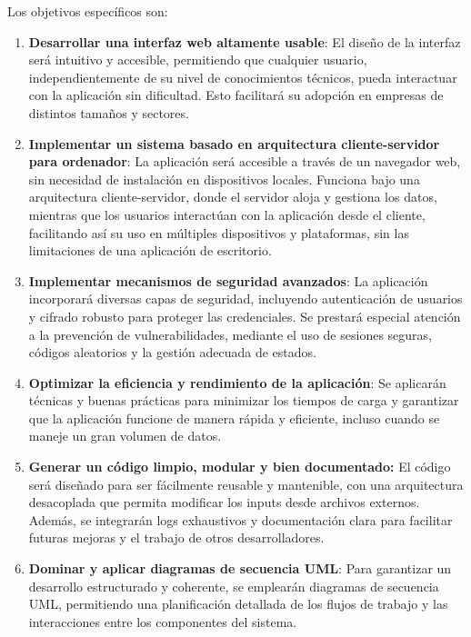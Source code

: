 \documentclass[draft]{scrbook}
\begin{document}
Los objetivos específicos son:
\begin{enumerate}
    \item \textbf{Desarrollar una interfaz web altamente usable}: El diseño de la interfaz será intuitivo y accesible, permitiendo que cualquier usuario, independientemente de su nivel de conocimientos técnicos, pueda interactuar con la aplicación sin dificultad. Esto facilitará su adopción en empresas de distintos tamaños y sectores.

    \item \textbf{Implementar un sistema basado en arquitectura cliente-servidor para ordenador}: La aplicación será accesible a través de un navegador web, sin necesidad de instalación en dispositivos locales. Funciona bajo una arquitectura cliente-servidor, donde el servidor aloja y gestiona los datos, mientras que los usuarios interactúan con la aplicación desde el cliente, facilitando así su uso en múltiples dispositivos y plataformas, sin las limitaciones de una aplicación de escritorio.
    
    \item \textbf{Implementar mecanismos de seguridad avanzados}: La aplicación incorporará diversas capas de seguridad, incluyendo autenticación de usuarios y cifrado robusto para proteger las credenciales. Se prestará especial atención a la prevención de vulnerabilidades, mediante el uso de sesiones seguras, códigos aleatorios y la gestión adecuada de estados.
    
    \item \textbf{Optimizar la eficiencia y rendimiento de la aplicación}: Se aplicarán técnicas y buenas prácticas para minimizar los tiempos de carga y garantizar que la aplicación funcione de manera rápida y eficiente, incluso cuando se maneje un gran volumen de datos.

    \item \textbf{Generar un código limpio, modular y bien documentado:} El código será diseñado para ser fácilmente reusable y mantenible, con una arquitectura desacoplada que permita modificar los inputs desde archivos externos. Además, se integrarán logs exhaustivos y documentación clara para facilitar futuras mejoras y el trabajo de otros desarrolladores.

    \item \textbf{Dominar y aplicar diagramas de secuencia UML}: Para garantizar un desarrollo estructurado y coherente, se emplearán diagramas de secuencia UML, permitiendo una planificación detallada de los flujos de trabajo y las interacciones entre los componentes del sistema.

\end{enumerate}
\end{document}
